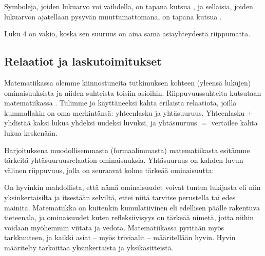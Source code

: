 Symboleja, joiden lukuarvo voi vaihdella, on tapana kutsua , ja sellaisia, joiden lukuarvon ajatellaan pysyvän muuttumattomana, on tapana kutsua .

\begin{esimerkki}
Luku $4$ on vakio, koska sen suuruus on aina sama asiayhteydestä riippumatta.
\end{esimerkki}


\subsection{Relaatiot ja laskutoimitukset}

Matematiikassa olemme kiinnostuneita tutkimuksen kohteen (yleensä lukujen) ominaisuuksista ja niiden suhteista toisiin asioihin. Riippuvuussuhteita kutsutaan matematiikassa . Tulimme jo käyttäneeksi kahta erilaista relaatiota, joilla kummallakin on oma merkintänsä: yhteenlasku ja yhtäsuuruus. Yhteenlasku $+$ yhdistää kaksi lukua yhdeksi uudeksi luvuksi, ja yhtäsuuruus $=$ vertailee kahta lukua keskenään.

Harjoituksena muodollisemmasta (formaalimmasta) matematiikasta esitämme tärkeitä yhtäsuuruusrelaation ominaisuuksia. Yhtäsuuruus on kahden luvun välinen riippuvuus, jolla on seuraavat kolme tärkeää ominaisuutta:


\begin{esimerkki}
\end{esimerkki}

On hyvinkin mahdollista, että nämä ominaisuudet voivat tuntua lukijasta  eli niin yksinkertaisilta ja itsestään selviltä, ettei niitä tarvitse perustella tai edes mainita. Matematiikka on kuitenkin kumulatiivinen eli edellisen päälle rakentuva tieteenala, ja ominaisuudet kuten refleksiivisyys on tärkeää nimetä, jotta niihin voidaan myöhemmin viitata ja vedota. Matematiikassa pyritään myös tarkkuuteen, ja kaikki asiat -- myös triviaalit -- määritellään hyvin. Hyvin määritelty tarkoittaa yksinkertaista ja yksikäsitteistä.

